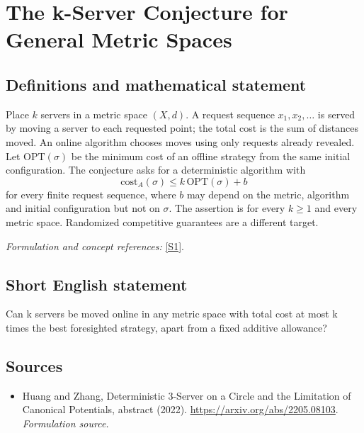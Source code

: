 \documentclass[11pt]{article}
\begin{document}
\section*{\texorpdfstring{The k-Server Conjecture for General Metric Spaces}{The k-Server Conjecture for General Metric Spaces}}\label{262}
\subsection{Definitions and mathematical statement}
Place $k$ servers in a metric space $(X,d)$. A request sequence $x_1,x_2,\ldots$ is served by moving a server to each requested point; the total cost is the sum of distances moved. An online algorithm chooses moves using only requests already revealed. Let $\mathrm{OPT}(\sigma)$ be the minimum cost of an offline strategy from the same initial configuration. The conjecture asks for a deterministic algorithm with
\[
 \mathrm{cost}_A(\sigma)\le k\,\mathrm{OPT}(\sigma)+b
\]
for every finite request sequence, where $b$ may depend on the metric, algorithm and initial configuration but not on $\sigma$. The assertion is for every $k\ge1$ and every metric space. Randomized competitive guarantees are a different target.
\par\smallskip\textit{Formulation and concept references:} \href{https://arxiv.org/abs/2205.08103}{[S1]}.

\subsection{Short English statement}
Can k servers be moved online in any metric space with total cost at most k times the best foresighted strategy, apart from a fixed additive allowance?
\subsection{Sources}
\begin{itemize}
\item[S1]Huang and Zhang, Deterministic 3-Server on a Circle and the Limitation of Canonical Potentials, abstract (2022).
\url{https://arxiv.org/abs/2205.08103}.
\textit{Formulation source.}
\end{itemize}
\end{document}
